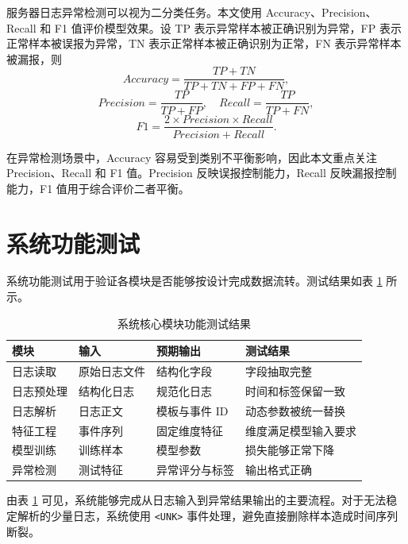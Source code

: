 服务器日志异常检测可以视为二分类任务。本文使用 Accuracy、Precision、Recall 和 F1 值评价模型效果。设 TP 表示异常样本被正确识别为异常，FP 表示正常样本被误报为异常，TN 表示正常样本被正确识别为正常，FN 表示异常样本被漏报，则
\begin{equation}
    Accuracy=\frac{TP+TN}{TP+TN+FP+FN},
\end{equation}
\begin{equation}
    Precision=\frac{TP}{TP+FP},\quad Recall=\frac{TP}{TP+FN},
\end{equation}
\begin{equation}
    F1=\frac{2\times Precision\times Recall}{Precision+Recall}.
\end{equation}

在异常检测场景中，Accuracy 容易受到类别不平衡影响，因此本文重点关注 Precision、Recall 和 F1 值。Precision 反映误报控制能力，Recall 反映漏报控制能力，F1 值用于综合评价二者平衡。

\section{系统功能测试}

系统功能测试用于验证各模块是否能够按设计完成数据流转。测试结果如表 \ref{tab:function_test_result_revised} 所示。

\begin{table}[htbp]
    \centering
    \caption{系统核心模块功能测试结果}
    \label{tab:function_test_result_revised}
    \begin{tabular}{p{2.5cm}p{3cm}p{3cm}p{3cm}}
        \hline
        \textbf{模块} & \textbf{输入} & \textbf{预期输出} & \textbf{测试结果} \\
        \hline
        日志读取 & 原始日志文件 & 结构化字段 & 字段抽取完整 \\
        日志预处理 & 结构化日志 & 规范化日志 & 时间和标签保留一致 \\
        日志解析 & 日志正文 & 模板与事件 ID & 动态参数被统一替换 \\
        特征工程 & 事件序列 & 固定维度特征 & 维度满足模型输入要求 \\
        模型训练 & 训练样本 & 模型参数 & 损失能够正常下降 \\
        异常检测 & 测试特征 & 异常评分与标签 & 输出格式正确 \\
        \hline
    \end{tabular}
\end{table}

由表 \ref{tab:function_test_result_revised} 可见，系统能够完成从日志输入到异常结果输出的主要流程。对于无法稳定解析的少量日志，系统使用 \texttt{<UNK>} 事件处理，避免直接删除样本造成时间序列断裂。


